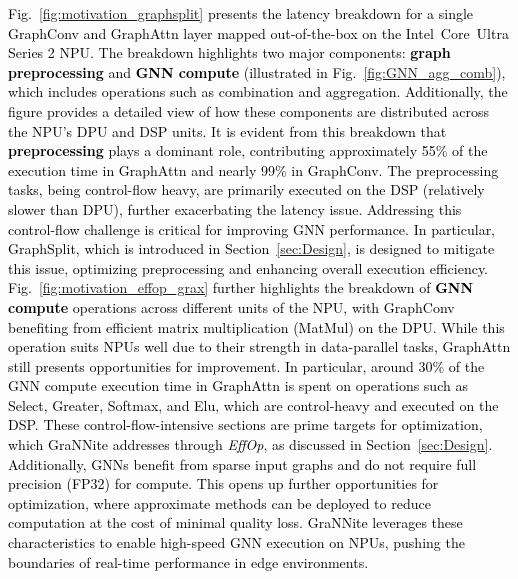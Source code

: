 \textcolor{black}{Fig.~\ref{fig:motivation_graphsplit} presents the latency breakdown for a single GraphConv and GraphAttn layer mapped out-of-the-box on the Intel\textregistered\ Core\texttrademark\ Ultra Series 2 NPU. The breakdown highlights two major components: \textbf{graph preprocessing} and \textbf{GNN compute} (illustrated in Fig.~\ref{fig:GNN_agg_comb}), which includes operations such as combination and aggregation. Additionally, the figure provides a detailed view of how these components are distributed across the NPU's DPU and DSP units. It is evident from this breakdown that \textbf{preprocessing} plays a dominant role, contributing approximately 55\% of the execution time in GraphAttn and nearly 99\% in GraphConv. The preprocessing tasks, being control-flow heavy, are primarily executed on the DSP (relatively slower than DPU), further exacerbating the latency issue.
Addressing this control-flow challenge is critical for improving GNN performance. In particular, GraphSplit, which is introduced in Section~\ref{sec:Design}, is designed to mitigate this issue, optimizing preprocessing and enhancing overall execution efficiency. Fig.~\ref{fig:motivation_effop_grax} further highlights the breakdown of \textbf{GNN compute} operations across different units of the NPU, with GraphConv benefiting from efficient matrix multiplication (MatMul) on the DPU. While this operation suits NPUs well due to their strength in data-parallel tasks, GraphAttn still presents opportunities for improvement. In particular, around 30\% of the GNN compute execution time in GraphAttn is spent on operations such as Select, Greater, Softmax, and Elu, which are control-heavy and executed on the DSP. These control-flow-intensive sections are prime targets for optimization, which GraNNite addresses through \textit{EffOp}, as discussed in Section~\ref{sec:Design}.
Additionally, GNNs benefit from sparse input graphs and do not require full precision (FP32) for compute. This opens up further opportunities for optimization, where approximate methods can be deployed to reduce computation at the cost of minimal quality loss. GraNNite leverages these characteristics to enable high-speed GNN execution on NPUs, pushing the boundaries of real-time performance in edge environments.}

